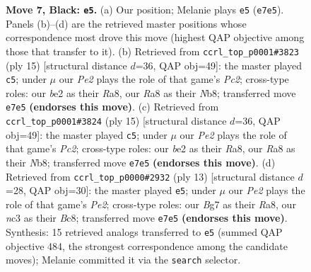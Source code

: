 \documentclass[11pt]{article}
\begin{document}
\begin{figure}[p]
\caption{\textbf{Move 7, Black: \texttt{e5}.} (a) Our position; Melanie plays \texttt{e5} (\texttt{e7e5}). Panels (b)--(d) are the retrieved master positions whose correspondence most drove this move (highest QAP objective among those that transfer to it). (b) Retrieved from \texttt{ccrl\_top\_p0001\#3823} (ply 15) [structural distance $d$=36, QAP obj=49]: the master played \texttt{c5}; under $\mu$ our \emph{Pe2} plays the role of that game's \emph{Pc2}; cross-type roles: our \emph{b}e2 as their \emph{R}a8, our \emph{R}a8 as their \emph{N}b8; transferred move \texttt{e7e5} \textbf{(endorses this move)}. (c) Retrieved from \texttt{ccrl\_top\_p0001\#3824} (ply 15) [structural distance $d$=36, QAP obj=49]: the master played \texttt{c5}; under $\mu$ our \emph{Pe2} plays the role of that game's \emph{Pc2}; cross-type roles: our \emph{b}e2 as their \emph{R}a8, our \emph{R}a8 as their \emph{N}b8; transferred move \texttt{e7e5} \textbf{(endorses this move)}. (d) Retrieved from \texttt{ccrl\_top\_p0000\#2932} (ply 13) [structural distance $d$=28, QAP obj=30]: the master played \texttt{e5}; under $\mu$ our \emph{Pe2} plays the role of that game's \emph{Pe2}; cross-type roles: our \emph{B}g7 as their \emph{R}a8, our \emph{n}c3 as their \emph{B}c8; transferred move \texttt{e7e5} \textbf{(endorses this move)}. Synthesis: 15 retrieved analogs transferred to \texttt{e5} (summed QAP objective 484, the strongest correspondence among the candidate moves); Melanie committed it via the \texttt{search} selector.}
\label{fig:thought-m13}
\end{figure}

\clearpage
\end{document}
